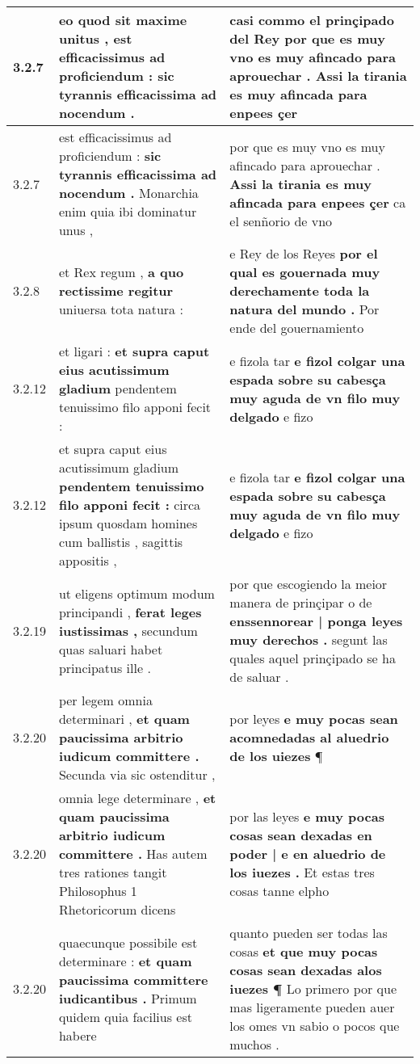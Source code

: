 \begin{tabular}{|p{1cm}|p{6.5cm}|p{6.5cm}|}
3.2.7 & eo quod sit maxime unitus , \textbf{ est efficacissimus ad proficiendum : } sic tyrannis efficacissima ad nocendum . & casi commo el prinçipado del Rey \textbf{ por que es muy vno es muy afincado para aprouechar . } Assi la tirania es muy afincada para enpees çer \\\hline
3.2.7 & est efficacissimus ad proficiendum : \textbf{ sic tyrannis efficacissima ad nocendum . } Monarchia enim quia ibi dominatur unus , & por que es muy vno es muy afincado para aprouechar . \textbf{ Assi la tirania es muy afincada para enpees çer } ca el senñorio de vno \\\hline
3.2.8 & et Rex regum , \textbf{ a quo rectissime regitur } uniuersa tota natura : & e Rey de los Reyes \textbf{ por el qual es gouernada muy derechamente toda la natura del mundo . } Por ende del gouernamiento \\\hline
3.2.12 & et ligari : \textbf{ et supra caput eius acutissimum gladium } pendentem tenuissimo filo apponi fecit : & e fizola tar \textbf{ e fizol colgar una espada sobre su cabesça muy aguda de vn filo muy delgado } e fizo \\\hline
3.2.12 & et supra caput eius acutissimum gladium \textbf{ pendentem tenuissimo filo apponi fecit : } circa ipsum quosdam homines cum ballistis , sagittis appositis , & e fizola tar \textbf{ e fizol colgar una espada sobre su cabesça muy aguda de vn filo muy delgado } e fizo \\\hline
3.2.19 & ut eligens optimum modum principandi , \textbf{ ferat leges iustissimas , } secundum quas saluari habet principatus ille . & por que escogiendo la meior manera de prinçipar o de \textbf{ enssennorear | ponga leyes muy derechos . } segunt las quales aquel prinçipado se ha de saluar . \\\hline
3.2.20 & per legem omnia determinari , \textbf{ et quam paucissima arbitrio iudicum committere . } Secunda via sic ostenditur , & por leyes \textbf{ e muy pocas sean acomnedadas al aluedrio de los uiezes } ¶ \\\hline
3.2.20 & omnia lege determinare , \textbf{ et quam paucissima arbitrio iudicum committere . } Has autem tres rationes tangit Philosophus 1 Rhetoricorum dicens & por las leyes \textbf{ e muy pocas cosas sean dexadas en poder | e en aluedrio de los iuezes . } Et estas tres cosas tanne elpho \\\hline
3.2.20 & quaecunque possibile est determinare : \textbf{ et quam paucissima committere iudicantibus . } Primum quidem quia facilius est habere & quanto pueden ser todas las cosas \textbf{ et que muy pocas cosas sean dexadas alos iuezes ¶ } Lo primero por que mas ligeramente pueden auer los omes vn sabio o pocos que muchos . \\\hline

\end{tabular}
